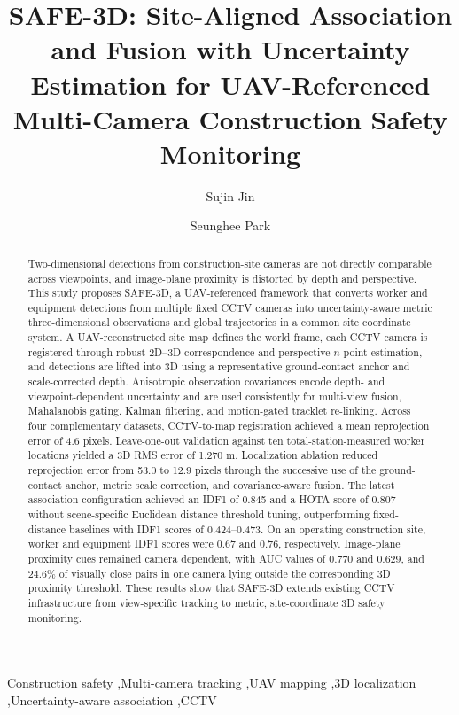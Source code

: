 \documentclass[preprint,12pt,numbers]{elsarticle}
\begin{document}
\begin{frontmatter}

\title{SAFE-3D: Site-Aligned Association and Fusion with Uncertainty Estimation for UAV-Referenced Multi-Camera Construction Safety Monitoring}

\author[skku]{Sujin Jin}
\author[skku]{Seunghee Park}
\address[skku]{Department of Global Smart City, Sungkyunkwan University, Suwon, Republic of Korea}

\begin{abstract}
Two-dimensional detections from construction-site cameras are not directly comparable across viewpoints, and image-plane proximity is distorted by depth and perspective. This study proposes SAFE-3D, a UAV-referenced framework that converts worker and equipment detections from multiple fixed CCTV cameras into uncertainty-aware metric three-dimensional observations and global trajectories in a common site coordinate system. A UAV-reconstructed site map defines the world frame, each CCTV camera is registered through robust 2D--3D correspondence and perspective-$n$-point estimation, and detections are lifted into 3D using a representative ground-contact anchor and scale-corrected depth. Anisotropic observation covariances encode depth- and viewpoint-dependent uncertainty and are used consistently for multi-view fusion, Mahalanobis gating, Kalman filtering, and motion-gated tracklet re-linking. Across four complementary datasets, CCTV-to-map registration achieved a mean reprojection error of 4.6 pixels. Leave-one-out validation against ten total-station-measured worker locations yielded a 3D RMS error of 1.270 m. Localization ablation reduced reprojection error from 53.0 to 12.9 pixels through the successive use of the ground-contact anchor, metric scale correction, and covariance-aware fusion. The latest association configuration achieved an IDF1 of 0.845 and a HOTA score of 0.807 without scene-specific Euclidean distance threshold tuning, outperforming fixed-distance baselines with IDF1 scores of 0.424--0.473. On an operating construction site, worker and equipment IDF1 scores were 0.67 and 0.76, respectively. Image-plane proximity cues remained camera dependent, with AUC values of 0.770 and 0.629, and 24.6\% of visually close pairs in one camera lying outside the corresponding 3D proximity threshold. These results show that SAFE-3D extends existing CCTV infrastructure from view-specific tracking to metric, site-coordinate 3D safety monitoring.
\end{abstract}

\begin{keyword}
Construction safety \sep Multi-camera tracking \sep UAV mapping \sep 3D localization \sep Uncertainty-aware association \sep CCTV
\end{keyword}

\end{frontmatter}
\end{document}
